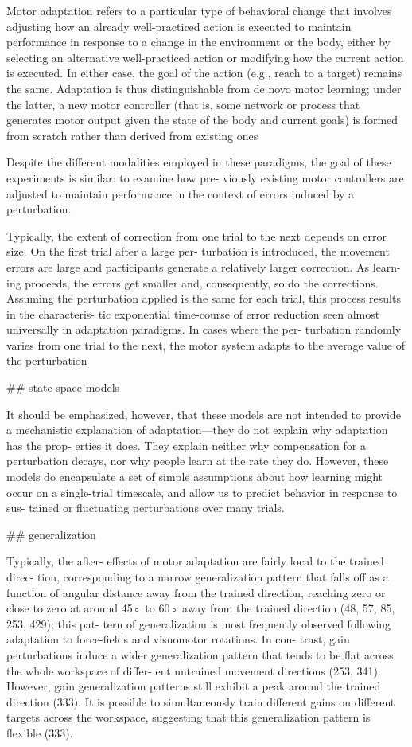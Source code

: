 \documentclass[../main.tex]{subfiles}
\begin{document}
{{Motor adaptation refers to a particular type of behavioral change that involves adjusting how an already well-practiced action is executed to maintain performance in response to a change in the environment or the body, either by selecting an alternative well-practiced action or modifying how the current action is executed. In either case, the goal of the action (e.g., reach to a target) remains the same. Adaptation is thus distinguishable from de novo motor learning; under the latter, a new motor controller (that is, some network or process that generates motor output given the state of the body and current goals) is formed from scratch rather than derived from existing ones

Despite the different modalities employed in these paradigms, the goal of these experiments is similar: to examine how pre- viously existing motor controllers are adjusted to maintain performance in the context of errors induced by a perturbation.

Typically, the extent of correction from one trial to the next depends on error size. On the first trial after a large per- turbation is introduced, the movement errors are large and participants generate a relatively larger correction. As learn- ing proceeds, the errors get smaller and, consequently, so do the corrections. Assuming the perturbation applied is the same for each trial, this process results in the characteris- tic exponential time-course of error reduction seen almost universally in adaptation paradigms. In cases where the per- turbation randomly varies from one trial to the next, the motor system adapts to the average value of the perturbation

## state space models

It should be emphasized, however, that these models are not intended to provide a mechanistic explanation of adaptation—they do not explain why adaptation has the prop- erties it does. They explain neither why compensation for a perturbation decays, nor why people learn at the rate they do. However, these models do encapsulate a set of simple assumptions about how learning might occur on a single-trial timescale, and allow us to predict behavior in response to sus- tained or fluctuating perturbations over many trials.

## generalization

Typically, the after- effects of motor adaptation are fairly local to the trained direc- tion, corresponding to a narrow generalization pattern that falls off as a function of angular distance away from the trained direction, reaching zero or close to zero at around 45◦ to 60◦ away from the trained direction (48, 57, 85, 253, 429); this pat- tern of generalization is most frequently observed following adaptation to force-fields and visuomotor rotations. In con- trast, gain perturbations induce a wider generalization pattern that tends to be flat across the whole workspace of differ- ent untrained movement directions (253, 341). However, gain generalization patterns still exhibit a peak around the trained direction (333). It is possible to simultaneously train different gains on different targets across the workspace, suggesting that this generalization pattern is flexible (333).

}}
\end{document}
